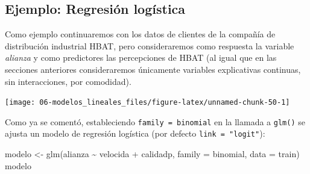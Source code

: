 \documentclass[
  spanish,
]{book}
\newenvironment{Shaded}{\begin{snugshade}}{\end{snugshade}}
\newcommand{\AttributeTok}[1]{\textcolor[rgb]{0.77,0.63,0.00}{#1}}
\newcommand{\CommentTok}[1]{\textcolor[rgb]{0.56,0.35,0.01}{\textit{#1}}}
\newcommand{\DecValTok}[1]{\textcolor[rgb]{0.00,0.00,0.81}{#1}}
\newcommand{\FloatTok}[1]{\textcolor[rgb]{0.00,0.00,0.81}{#1}}
\newcommand{\FunctionTok}[1]{\textcolor[rgb]{0.00,0.00,0.00}{#1}}
\newcommand{\NormalTok}[1]{#1}
\newcommand{\OtherTok}[1]{\textcolor[rgb]{0.56,0.35,0.01}{#1}}
\newcommand{\SpecialCharTok}[1]{\textcolor[rgb]{0.00,0.00,0.00}{#1}}
\theoremstyle{break}
\theoremstyle{definition}
\theoremstyle{definition}
\theoremstyle{definition}
\theoremstyle{definition}
\theoremstyle{remark}
\begin{document}
\hypertarget{ejemplo-regresiuxf3n-loguxedstica}{%
\subsection{Ejemplo: Regresión logística}\label{ejemplo-regresiuxf3n-loguxedstica}}

Como ejemplo continuaremos con los datos de clientes de la compañía de distribución industrial HBAT, pero consideraremos como respuesta la variable \emph{alianza} y como predictores las percepciones de HBAT (al igual que en las secciones anteriores consideraremos únicamente variables explicativas continuas, sin interacciones, por comodidad).

\begin{Shaded}
\end{Shaded}

\begin{center}\texttt{[image: 06-modelos\_lineales\_files/figure-latex/unnamed-chunk-50-1]} \end{center}

Como ya se comentó, estableciendo \texttt{family\ =\ binomial} en la llamada a \texttt{glm()} se ajusta un modelo de regresión logística (por defecto \texttt{link\ =\ "logit"}):

\begin{Shaded}
\begin{Highlighting}[]
\NormalTok{modelo }\OtherTok{\textless{}{-}} \FunctionTok{glm}\NormalTok{(alianza }\SpecialCharTok{\textasciitilde{}}\NormalTok{ velocida }\SpecialCharTok{+}\NormalTok{ calidadp, }\AttributeTok{family =}\NormalTok{ binomial, }\AttributeTok{data =}\NormalTok{ train)}
\NormalTok{modelo}
\end{Highlighting}
\end{Shaded}
\end{document}
